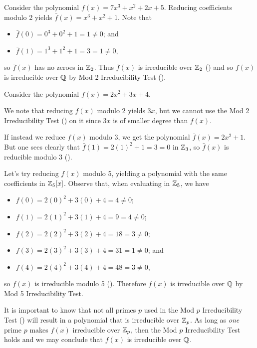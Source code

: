\begin{example}
    Consider the polynomial $f(x) = 7x^3 + x^2 + 2x + 5$. Reducing coefficients modulo 2 yields $\bar{f}(x) = x^3 + x^2 + 1$. Note that
    \begin{itemize}
        \item $\bar{f}(0) = 0^3 + 0^2 + 1 = 1 \neq 0$; and
        \item $\bar{f}(1) = 1^3 + 1^2 + 1 = 3 = 1 \neq 0$,
    \end{itemize}
    so $\bar{f}(x)$ has no zeroes in $\mathbb{Z}_2$. Thus $\bar{f}(x)$ is irreducible over $\mathbb{Z}_2$ () and so $f(x)$ is irreducible over $\mathbb{Q}$ by Mod 2 Irreducibility Test ().
\end{example}
\begin{example}
    Consider the polynomial $f(x) = 2x^2 + 3x + 4$.

    We note that reducing $f(x)$ modulo 2 yields $3x$, but we cannot use the Mod 2 Irreducibility Test () on it since $3x$ is of smaller degree than $f(x)$.

    If instead we reduce $f(x)$ modulo 3, we get the polynomial $\bar{f}(x) = 2x^2 + 1$. But one sees clearly that $\bar{f}(1) = 2(1)^2 + 1 = 3 = 0$ in $\mathbb{Z}_3$, so $\bar{f}(x)$ is reducible modulo 3 ().

    Let's try reducing $f(x)$ modulo 5, yielding a polynomial with the same coefficients in $\mathbb{Z}_5[x]$. Observe that, when evaluating in $\mathbb{Z}_5$, we have
    \begin{itemize}
        \item $f(0) = 2(0)^2 + 3(0) + 4 = 4 \neq 0$;
        \item $f(1) = 2(1)^2 + 3(1) + 4 = 9 = 4 \neq 0$;
        \item $f(2) = 2(2)^2 + 3(2) + 4 = 18 = 3 \neq 0$;
        \item $f(3) = 2(3)^2 + 3(3) + 4 = 31 = 1 \neq 0$; and
        \item $f(4) = 2(4)^2 + 3(4) + 4 = 48 = 3 \neq 0$,
    \end{itemize}
    so $f(x)$ is irreducible modulo 5 (). Therefore $f(x)$ is irreducible over $\mathbb{Q}$ by Mod 5 Irreducibility Test.
\end{example}

It is important to know that not all primes $p$ used in the Mod $p$ Irreducibility Test () will result in a polynomial that is irreducible over $\mathbb{Z}_p$. As long as \textit{one} prime $p$ makes $f(x)$ irreducible over $\mathbb{Z}_p$, then the Mod $p$ Irreducibility Test holds and we may conclude that $f(x)$ is irreducible over $\mathbb{Q}$.

